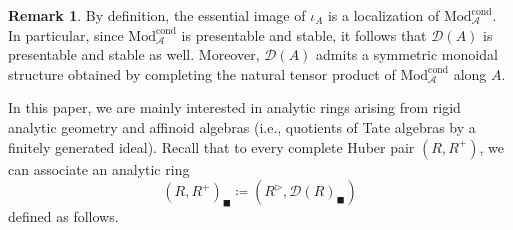 \documentclass[oneside, hidelinks, 12pt, a4paper,reqno]{amsart}
\theoremstyle{plain}
\theoremstyle{definition}
\newtheorem{remark}[remark]{Remark}
\theoremstyle{plain}
\newcommand{\cA}{\mathscr A}
\newcommand{\cD}{\mathscr D}
\newcommand{\Mod}{\mathrm{Mod}}
\newcommand{\Solid}{\blacksquare}
\begin{document}
\begin{remark} \cite[Remark 2.2.3]{montagnani2025axiomaticapproachanalytic1affineness} 
    By definition, the essential image of $\iota_{A}$ is a localization of $\Mod_{\cA}^{\mathrm{cond}}$. In particular, since $\Mod_{\cA}^{\mathrm{cond}}$ is presentable and stable, it follows that $\cD(A)$ is presentable and stable as well. Moreover, $\cD(A)$ admits a symmetric monoidal structure obtained by completing the natural tensor product of $\Mod_{\cA}^{\mathrm{cond}}$ along $A$.
\end{remark}

In this paper, we are mainly interested in analytic rings arising from rigid analytic geometry and affinoid algebras (i.e., quotients of Tate algebras by a finitely generated ideal). Recall that to every complete Huber pair $(R,R^{+})$, we can associate an analytic ring 
\[
(R,R^+)_{\Solid} \coloneqq (R^{\triangleright},\cD(R)_{\Solid})
\]
defined as follows.
\end{document}

